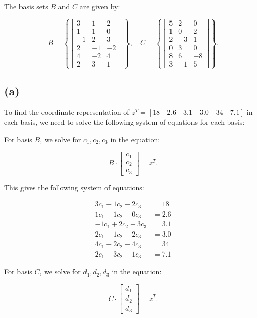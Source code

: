 \documentclass{article}
\begin{document}
The basis sets \( B \) and \( C \) are given by:

\[
B = \left\{
\begin{bmatrix} 
3 & 1 & 2 \\
1 & 1 & 0 \\
-1 & 2 & 3 \\
2 & -1 & -2 \\
4 & -2 & 4 \\
2 & 3 & 1 
\end{bmatrix}
\right\}, 
\quad C = \left\{
\begin{bmatrix} 
5 & 2 & 0 \\
1 & 0 & 2 \\
2 & -3 & 1 \\
0 & 3 & 0 \\
8 & 6 & -8 \\
3 & -1 & 5 
\end{bmatrix}
\right\}.
\]

\subsection*{(a)}

To find the coordinate representation of \( z^T = [18 \quad 2.6 \quad 3.1 \quad 3.0 \quad 34 \quad 7.1] \) in each basis, we need to solve the following system of equations for each basis:

For basis \( B \), we solve for \( c_1, c_2, c_3 \) in the equation:

\[
B \cdot \begin{bmatrix} c_1 \\ c_2 \\ c_3 \end{bmatrix} = z^T.
\]

This gives the following system of equations:

\[
\begin{aligned}
3c_1 + 1c_2 + 2c_3 &= 18 \\
1c_1 + 1c_2 + 0c_3 &= 2.6 \\
-1c_1 + 2c_2 + 3c_3 &= 3.1 \\
2c_1 - 1c_2 - 2c_3 &= 3.0 \\
4c_1 - 2c_2 + 4c_3 &= 34 \\
2c_1 + 3c_2 + 1c_3 &= 7.1
\end{aligned}
\]

For basis \( C \), we solve for \( d_1, d_2, d_3 \) in the equation:

\[
C \cdot \begin{bmatrix} d_1 \\ d_2 \\ d_3 \end{bmatrix} = z^T.
\]
\end{document}
